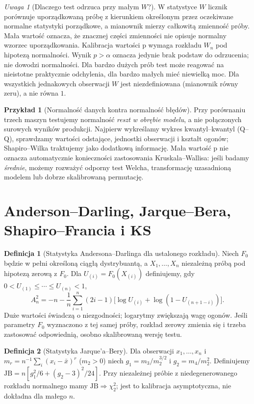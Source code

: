 \documentclass[11pt,a4paper,oneside]{report}
\numberwithin{equation}{chapter}
\theoremstyle{plain}
\theoremstyle{definition}
\newtheorem{definicja}{Definicja}[chapter]
\newtheorem{przyklad}{Przykład}[chapter]
\theoremstyle{remark}
\newtheorem{uwaga}{Uwaga}[chapter]
\begin{document}
\begin{uwaga}[Dlaczego test odrzuca przy małym $W$?]
W statystyce $W$ licznik porównuje uporządkowaną próbę z kierunkiem określonym przez oczekiwane normalne statystyki porządkowe, a mianownik mierzy całkowitą zmienność próby. Mała wartość oznacza, że znacznej części zmienności nie opisuje normalny wzorzec uporządkowania. Kalibracja wartości p wymaga rozkładu $W_n$ pod hipotezą normalności. Wynik $p>\alpha$ oznacza jedynie brak podstaw do odrzucenia; nie dowodzi normalności. Dla bardzo dużych prób test może reagować na nieistotne praktycznie odchylenia, dla bardzo małych mieć niewielką moc. Dla wszystkich jednakowych obserwacji $W$ jest niezdefiniowana (mianownik równy zeru), a nie równa $1$.
\end{uwaga}

\begin{przyklad}[Normalność danych kontra normalność błędów]
Przy porównaniu trzech maszyn testujemy normalność \emph{reszt w obrębie modelu}, a nie połączonych surowych wyników produkcji. Najpierw wykreślamy wykres kwantyl--kwantyl (Q--Q), sprawdzamy wartości odstające, jednostki obserwacji i kształt ogonów; Shapiro--Wilka traktujemy jako dodatkową informację. Mała wartość p nie oznacza automatycznie konieczności zastosowania Kruskala--Wallisa: jeśli badamy \emph{średnie}, możemy rozważyć odporny test Welcha, transformację uzasadnioną modelem lub dobrze skalibrowaną permutację.
\end{przyklad}

\section{Anderson--Darling, Jarque--Bera, Shapiro--Francia i KS}
\begin{definicja}[Statystyka Andersona--Darlinga dla ustalonego rozkładu]\label{def:ad}
Niech $F_0$ będzie w pełni określoną ciągłą dystrybuantą, a $X_1,\ldots,X_n$ niezależną próbą pod hipotezą zerową z $F_0$. Dla $U_{(i)}=F_0(X_{(i)})$ definiujemy, gdy $0<U_{(1)}\le\cdots\le U_{(n)}<1$,
\[
 A_n^2=-n-\frac1n\sum_{i=1}^n(2i-1)\bigl[\log U_{(i)}+\log(1-U_{(n+1-i)})\bigr].
\]
Duże wartości świadczą o niezgodności; logarytmy zwiększają wagę ogonów. Jeśli parametry $F_0$ wyznaczono z tej samej próby, rozkład zerowy zmienia się i trzeba zastosować odpowiednią, osobno skalibrowaną wersję testu.
\end{definicja}

\begin{definicja}[Statystyka Jarque'a--Bery]\label{def:jarque-bera}
Dla obserwacji $x_1,\ldots,x_n$ i $m_r=n^{-1}\sum_i(x_i-\bar x)^r$ ($m_2>0$) niech $g_1=m_3/m_2^{3/2}$ i $g_2=m_4/m_2^2$. Definiujemy $\mathrm{JB}=n[g_1^2/6+(g_2-3)^2/24]$. Przy niezależnej próbie z niedegenerowanego rozkładu normalnego mamy $\mathrm{JB}\Rightarrow\chi^2_2$; jest to kalibracja asymptotyczna, nie dokładna dla małego $n$.
\end{definicja}
\end{document}

